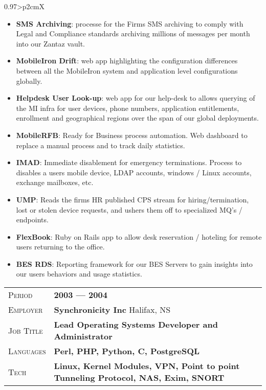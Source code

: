\documentclass[a4paper, oneside, final]{scrartcl}
\newcommand{\gray}{\rowcolor[gray]{.90}}
\begin{document}
\begin{center}
\begin{tabularx}{0.97\linewidth}{>{\raggedleft\scshape}p{2cm}X}
\begin{itemize}
\item \textbf{SMS Archiving}: processe for the Firms SMS archiving to comply with Legal and Compliance standards archiving millions of messages per month into our Zantaz vault.
\item \textbf{MobileIron Drift}: web app highlighting the configuration differences between all the MobileIron system and application level configurations globally.
\item \textbf{Helpdesk User Look-up}: web app for our help-desk to allows querying of the MI infra for user devices, phone numbers, application entitlements, enrollment and geographical regions over the span of our global deployments.
\item \textbf{MobileRFB}: Ready for Business process automation. Web dashboard to replace a manual process and to track daily statistics.
\item \textbf{IMAD}: Immediate disablement for emergency terminations. Process to disables a users mobile device, LDAP accounts, windows / Linux accounts, exchange mailboxes, etc.
\item \textbf{UMP}: Reads the firms HR published CPS stream for hiring/termination, lost or stolen device requests, and ushers them off to specialized MQ's / endpoints.
\item \textbf{FlexBook}: Ruby on Rails app to allow desk reservation / hoteling for remote users returning to the office.
\item \textbf{BES RDS}: Reporting framework for our BES Servers to gain insights into our users behaviors and usage statistics.
\end{itemize}
\end{tabularx}

\vspace{12pt}

\begin{tabularx}{0.97\linewidth}{>{\raggedleft\scshape}p{2cm}X}
\gray Period & \textbf{2003 --- 2004}\\
\gray Employer & \textbf{Synchronicity Inc} \hfill Halifax, NS\\
\gray Job Title & \textbf{Lead Operating Systems Developer and Administrator}\\
\gray Languages & \textbf{Perl, PHP, Python, C, PostgreSQL}\\
\gray Tech & \textbf{Linux, Kernel Modules, VPN, Point to point Tunneling Protocol, NAS, Exim, SNORT}\\


\end{tabularx}
\end{center}
\end{document}
